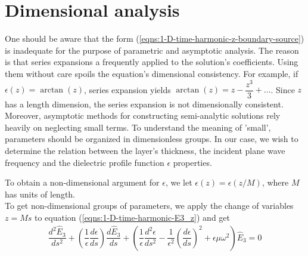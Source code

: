 \documentclass[12pt,twoside]{report}
\begin{document}
\section{Dimensional analysis }
One should be aware that the form (\ref{eqns:1-D-time-harmonic-z-boundary-source}) is inadequate for the purpose of parametric and asymptotic analysis. The reason is that series expansions a frequently applied to the solution's coefficients. Using them without care spoils the equation's dimensional consistency. For example, if $\epsilon(z) = \arctan(z)$, series expansion yields $\arctan(z) = z-\dfrac{z^3}{3} + \ldots$. Since $z$ has a length dimension, the series expansion is not dimensionally consistent. Moreover, asymptotic methods for constructing semi-analytic solutions rely heavily on neglecting small terms. To understand the meaning of 'small', parameters should be organized in dimensionless groups. In our case, we wish to determine the relation between the layer's thickness, the incident plane wave frequency and the dielectric profile function $\epsilon$ properties.
\begin{comment} 
\begin{itemize}
\item The dielectric profile's dynamic range - the difference between its $-\infty$ and $+\infty$ values, normalized by the $-\infty$ limit to  get an 'effective jump' measure;
\item The dielectric profile's proximity to a step function, essentially expressed by the size of the function's $z$-derivative at $z=0$ and the rate of its decay toward $\pm \infty$.
\end{itemize}
\end{comment}

To obtain a non-dimensional argument for $\epsilon$, we let $\epsilon(z) = \epsilon(z/M)$, where $M$ has units of length. \\
To get non-dimensional groups of parameters, we apply the change of variables $z= M s$ to equation (\ref{eqns:1-D-time-harmonic-E3_z}) and get
\begin{align}
\label{eqns:1-D-time-harmonic-z-normalized-boundary-source}
\dfrac{d^2\hat{E}_3}{ds^2} + \left( \dfrac{1}{\epsilon}\dfrac{d \epsilon}{ds}\right)\dfrac{d\hat{E}_3}{ds}
+ \left( \dfrac{1}{\epsilon}\dfrac{d^2\epsilon}{ds^2}
-\dfrac{1}{\epsilon^2}\left( \dfrac{d\epsilon}{ds}\right)^2 + \epsilon \mu \omega^2\right)\hat{E}_3 = 0
\end{align}
\end{document}
